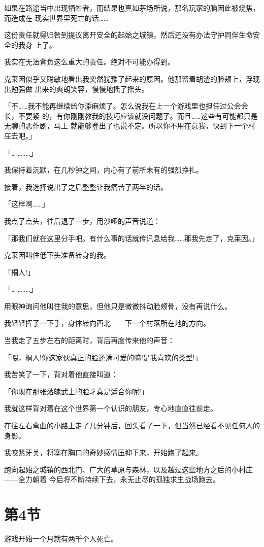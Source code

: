 \documentclass[11pt]{book}
\begin{document}
如果在路途当中出现牺牲者，而结果也真如茅场所说，那名玩家的脑因此被烧焦，而造成在
现实世界里死亡的话……

这份责任就得归咎到提议离开安全的起始之城镇，然后还没有办法守护同伴生命安全的我身
上了。

我实在无法背负这么重大的责任。绝对不可能办得到。

克莱因似乎又聪敏地看出我突然犹豫了起来的原因。他那留着胡渣的脸颊上，浮现出勉强做
出来的爽朗笑容，慢慢地摇了摇头。

「不……我不能再继续给你添麻烦了。怎么说我在上一个游戏里也担任过公会会长，不要紧
的，有你刚刚教我的技巧应该就没问题了。而且……这些有可能都只是无聊的恶作剧，马上
就能够登出了也说不定。所以你不用在意我，快到下一个村庄去吧。」

「…………」

我保持着沉默，在几秒钟之间，内心有了前所未有的强烈挣扎。

接着，我选择说出了之后整整让我痛苦了两年的话。

「这样啊……」

我点了点头，往后退了一步，用沙哑的声音说道：

「那我们就在这里分手吧。有什么事的话就传讯息给我……那我先走了，克莱因。」

克莱因叫住低下头准备转身的我。

「桐人!」

「…………」

用眼神询问他叫住我的意思，但他只是微微抖动脸颊骨，没有再说什么。

我轻轻挥了一下手，身体转向西北——下一个村落所在地的方向。

当我走了五步左右的距离时，背后再度传来他的声音：

「喂，桐人!你这家伙真正的脸还满可爱的嘛!是我喜欢的类型!」

我苦笑了一下，背对着他直接叫道：

「你现在那张落魄武士的脸才真是适合你呢!」

我就这样背对着在这个世界第一个认识的朋友，专心地直直往前走。

在往左右弯曲的小路上走了几分钟后，回头看了一下，但当然已经看不见任何人的身影。

我咬紧牙关，将塞在胸口的奇妙感情压抑下来，开始跑了起来。

跑向起始之城镇的西北门、广大的草原与森林，以及越过这些地方之后的小村庄——全力朝着
今后将不断持续下去，永无止尽的孤独求生战场跑去。
\section{第4节}
\label{sec:org2beda68}
游戏开始一个月就有两千个人死亡。
\end{document}
